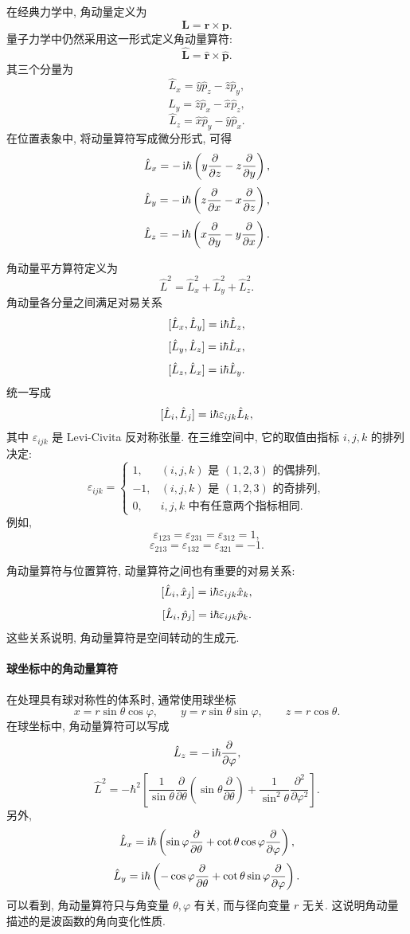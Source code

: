 在经典力学中, 角动量定义为
\[
\bm L=\bm r\times \bm p.
\]
量子力学中仍然采用这一形式定义角动量算符:
\[
\hat{\bm L}=\hat{\bm r}\times \hat{\bm p}.
\]
其三个分量为
\[
\hat L_x=\hat y\hat p_z-\hat z\hat p_y,
\]
\[
\hat L_y=\hat z\hat p_x-\hat x\hat p_z,
\]
\[
\hat L_z=\hat x\hat p_y-\hat y\hat p_x.
\]
在位置表象中, 将动量算符写成微分形式, 可得
\[
\hat L_x
=
-\mathop{}\!\mathrm{i}\hbar\left(
y\frac{\partial}{\partial z}
-
z\frac{\partial}{\partial y}
\right),
\]
\[
\hat L_y
=
-\mathop{}\!\mathrm{i}\hbar\left(
z\frac{\partial}{\partial x}
-
x\frac{\partial}{\partial z}
\right),
\]
\[
\hat L_z
=
-\mathop{}\!\mathrm{i}\hbar\left(
x\frac{\partial}{\partial y}
-
y\frac{\partial}{\partial x}
\right).
\]

角动量平方算符定义为
\[
\hat L^2
=
\hat L_x^2+\hat L_y^2+\hat L_z^2.
\]
角动量各分量之间满足对易关系
\[
[\hat L_x, \hat L_y]=\mathop{}\!\mathrm{i}\hbar\hat L_z,
\]
\[
[\hat L_y, \hat L_z]=\mathop{}\!\mathrm{i}\hbar\hat L_x,
\]
\[
[\hat L_z, \hat L_x]=\mathop{}\!\mathrm{i}\hbar\hat L_y.
\]
统一写成
\[
[\hat L_i, \hat L_j]
=
\mathop{}\!\mathrm{i}\hbar\varepsilon_{ijk}\hat L_k,
\]
其中 $\varepsilon_{ijk}$ 是 Levi-Civita 反对称张量. 在三维空间中, 它的取值由指标 $i, j, k$ 的排列决定:
\[
\varepsilon_{ijk}=
\begin{cases}
1, & (i, j, k)\text{ 是 }(1, 2, 3)\text{ 的偶排列}, \\
-1, & (i, j, k)\text{ 是 }(1, 2, 3)\text{ 的奇排列}, \\
0, & i, j, k\text{ 中有任意两个指标相同}.
\end{cases}
\]
例如,
\[
\varepsilon_{123}=\varepsilon_{231}=\varepsilon_{312}=1,
\]
\[
\varepsilon_{213}=\varepsilon_{132}=\varepsilon_{321}=-1.
\]

角动量算符与位置算符, 动量算符之间也有重要的对易关系:
\[
[\hat L_i, \hat x_j]
=
\mathop{}\!\mathrm{i}\hbar\varepsilon_{ijk}\hat x_k,
\]
\[
[\hat L_i, \hat p_j]
=
\mathop{}\!\mathrm{i}\hbar\varepsilon_{ijk}\hat p_k.
\]
这些关系说明, 角动量算符是空间转动的生成元.

\paragraph{球坐标中的角动量算符}

在处理具有球对称性的体系时, 通常使用球坐标
\[
x=r\sin\theta\cos\varphi, \qquad
y=r\sin\theta\sin\varphi, \qquad
z=r\cos\theta.
\]
在球坐标中, 角动量算符可以写成
\[
\hat L_z
=
-\mathop{}\!\mathrm{i}\hbar\frac{\partial}{\partial\varphi},
\]
\[
\hat L^2
=
-\hbar^2
\left[
\frac{1}{\sin\theta}
\frac{\partial}{\partial\theta}
\left(
\sin\theta
\frac{\partial}{\partial\theta}
\right)
+
\frac{1}{\sin^2\theta}
\frac{\partial^2}{\partial\varphi^2}
\right].
\]
另外,
\[
\hat L_x
=
\mathop{}\!\mathrm{i}\hbar
\left(
\sin\varphi\frac{\partial}{\partial\theta}
+
\cot\theta\cos\varphi\frac{\partial}{\partial\varphi}
\right),
\]
\[
\hat L_y
=
\mathop{}\!\mathrm{i}\hbar
\left(
-\cos\varphi\frac{\partial}{\partial\theta}
+
\cot\theta\sin\varphi\frac{\partial}{\partial\varphi}
\right).
\]
可以看到, 角动量算符只与角变量 $\theta, \varphi$ 有关, 而与径向变量 $r$ 无关. 这说明角动量描述的是波函数的角向变化性质.

